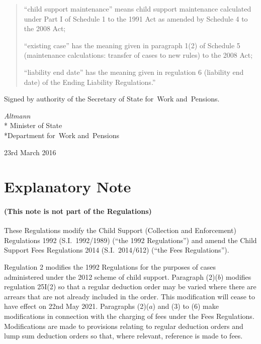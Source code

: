 \documentclass[12pt,a4paper]{article}
\begin{document}
\begin{quotation}
\begin{enumerate}
        “child support maintenance” means child support maintenance calculated under Part I of Schedule 1 to the 1991 Act as amended by Schedule 4 to the 2008 Act;

        “existing case” has the meaning given in paragraph 1(2) of Schedule 5 (maintenance calculations: transfer of cases to new rules) to the 2008 Act;

        “liability end date” has the meaning given in regulation 6 (liability end date) of 
the Ending Liability Regulations.”
\end{enumerate}
\end{quotation}

\bigskip

\pagebreak[3]

Signed 
by authority of the 
Secretary of State for~Work and~Pensions.

{\raggedleft
\emph{Altmann}\\*
Minister
of State\\*Department 
for~Work and~Pensions

}

23rd March 2016

\small

\part{Explanatory Note}

\renewcommand\parthead{— Explanatory Note}

\subsection*{(This note is not part of the Regulations)}

These Regulations modify the Child Support (Collection and Enforcement) Regulations 1992 (S.I.~1992/1989) (“the 1992 Regulations”) and amend the Child Support Fees Regulations 2014 (S.I.~2014/612) (“the Fees Regulations”).

Regulation 2 modifies the 1992 Regulations for the purposes of cases administered under the 2012 scheme of child support. Paragraph (2)($b$) modifies regulation 25I(2) so that a regular deduction order may be varied where there are arrears that are not already included in the order. This modification will cease to have effect on 22nd May 2021. Paragraphs (2)($a$) and (3) to (6) make modifications in connection with the charging of fees under the Fees Regulations. Modifications are made to provisions relating to regular deduction orders and lump sum deduction orders so that, where relevant, reference is made to fees.
\end{document}
